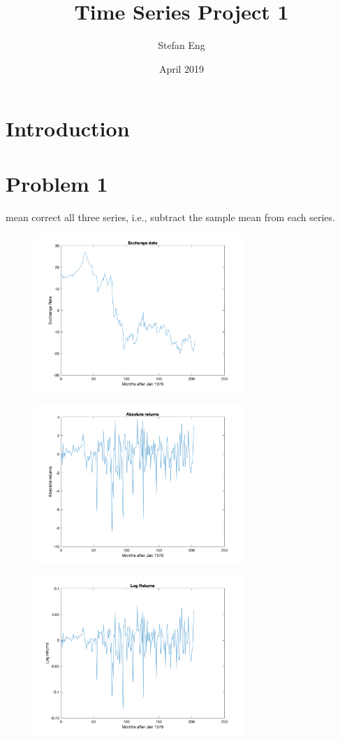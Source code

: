 \documentclass{article}
\title{Time Series Project 1}
\author{Stefan Eng }
\date{April 2019}
\begin{document}
\maketitle

\section{Introduction}
\cite{bd}

\section*{Problem 1}
mean correct all three series, i.e., subtract the sample mean from each series.

\begin{figure}[t]
\includegraphics[width=8cm]{plots/exchangedata.png}
\centering
\end{figure}

\begin{figure}[t]
\includegraphics[width=8cm]{plots/abs_returns.png}
\centering
\end{figure}

\begin{figure}[t]
\includegraphics[width=8cm]{plots/log_returns.png}
\centering
\end{figure}
\end{document}
